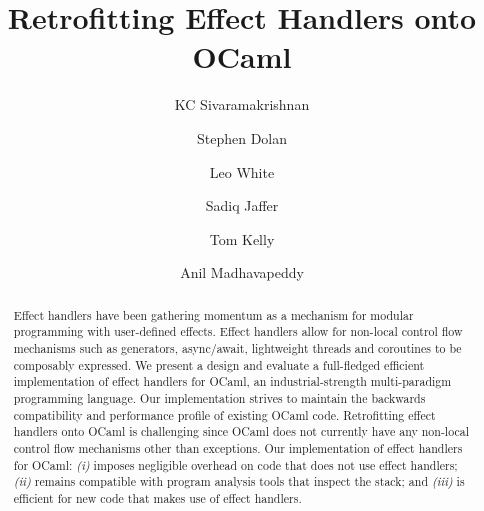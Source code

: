 \documentclass[sigplan,screen]{acmart}
\begin{document}
\title{Retrofitting Effect Handlers onto OCaml}

\author{KC Sivaramakrishnan}

\author{Stephen Dolan}

\author{Leo White}

\author{Sadiq Jaffer}

\author{Tom Kelly}

\author{Anil Madhavapeddy}

\begin{abstract}
Effect handlers have been gathering momentum as a mechanism for modular
	programming with user-defined effects. Effect handlers allow for non-local
	control flow mechanisms such as generators, async/await, lightweight threads
	and coroutines to be composably expressed. We present a design and evaluate a
	full-fledged efficient implementation of effect handlers for OCaml, an
	industrial-strength multi-paradigm programming language. Our implementation
	strives to maintain the backwards compatibility and performance profile of
	existing OCaml code. Retrofitting effect handlers onto OCaml is challenging
	since OCaml does not currently have any non-local control flow mechanisms
	other than exceptions. Our implementation of effect handlers for OCaml: {\em
	(i)} imposes negligible overhead on code that does not use effect handlers;
	{\em (ii)} remains compatible with program analysis tools that inspect the
	stack; and {\em (iii)} is efficient for new code that makes use of effect
	handlers.
\end{abstract}
\end{document}
